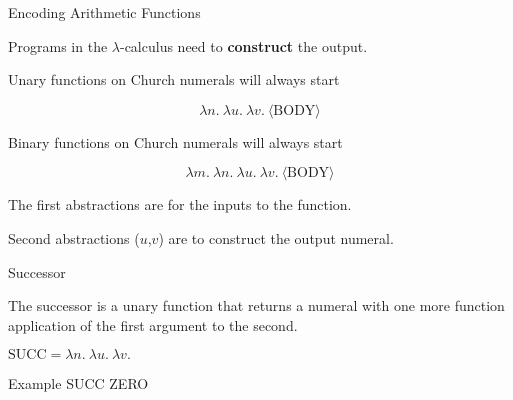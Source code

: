 \documentclass{beamer}
\begin{document}
\begin{frame}{Encoding Arithmetic Functions}

    
    
    
    
    Programs in the $\lambda$-calculus need to {\bf construct} the output.
    
    \vspace{0.3cm}
    
    Unary functions on Church numerals will always start 
    
    $$\lambda n. \ \lambda u. \ \lambda v. \ \langle \text{BODY} \rangle$$
    
    Binary functions on Church numerals will always start 
    
    $$\lambda m. \ \lambda n. \ \lambda u. \ \lambda v. \ \langle \text{BODY} \rangle $$
    
    \vspace{0.3cm}
    
    The first abstractions are for the inputs to the function. 
    
    \vspace{0.3cm}
    
    Second abstractions ($u$,$v$) are to construct the output numeral. 

\end{frame}


\begin{frame}{Successor}

    The successor is a unary function that returns a numeral with one more function application of the first argument to the second.
    
    \vspace{0.3cm}
    
    $\text{SUCC} = \lambda n. \ \lambda u. \ \lambda v. \ $
    
    \vspace{6cm}
        
\end{frame}

\begin{frame}{Example}
    SUCC ZERO
    
    \vspace{7cm}  
\end{frame}
\end{document}
